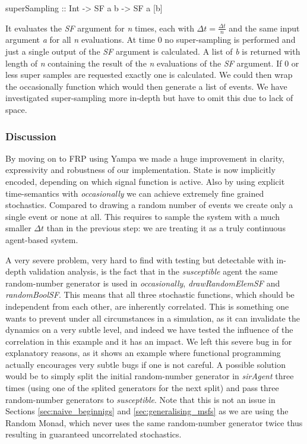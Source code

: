 \begin{HaskellCode}
superSampling :: Int -> SF a b -> SF a [b]
\end{HaskellCode}

It evaluates the \textit{SF} argument for \textit{n} times, each with $\Delta t = \frac{\Delta t}{n}$ and the same input argument \textit{a} for all \textit{n} evaluations. At time 0 no super-sampling is performed and just a single output of the \textit{SF} argument is calculated. A list of \textit{b} is returned with length of \textit{n} containing the result of the \textit{n} evaluations of the \textit{SF} argument. If 0 or less super samples are requested exactly one is calculated. We could then wrap the occasionally function which would then generate a list of events. We have investigated super-sampling more in-depth but have to omit this due to lack of space.

\subsubsection{Discussion}
By moving on to FRP using Yampa we made a huge improvement in clarity, expressivity and robustness of our implementation. State is now implicitly encoded, depending on which signal function is active. Also by using explicit time-semantics with \textit{occasionally} we can achieve extremely fine grained stochastics. Compared to drawing a random number of events we create only a single event or none at all. This requires to sample the system with a much smaller $\Delta t$ than in the previous step: we are treating it as a truly continuous agent-based system.

A very severe problem, very hard to find with testing but detectable with in-depth validation analysis, is the fact that in the \textit{susceptible} agent the same random-number generator is used in \textit{occasionally}, \textit{drawRandomElemSF} and \textit{randomBoolSF}. This means that all three stochastic functions, which should be independent from each other, are inherently correlated. This is something one wants to prevent under all circumstances in a simulation, as it can invalidate the dynamics on a very subtle level, and indeed we have tested the influence of the correlation in this example and it has an impact. We left this severe bug in for explanatory reasons, as it shows an example where functional programming actually encourages very subtle bugs if one is not careful. A possible solution would be to simply split the initial random-number generator in \textit{sirAgent} three times (using one of the splited generators for the next split) and pass three random-number generators to \textit{susceptible}. Note that this is not an issue in Sections \ref{sec:naive_beginnigs} and \ref{sec:generalising_msfs} as we are using the Random Monad, which never uses the same random-number generator twice thus resulting in guaranteed uncorrelated stochastics.

